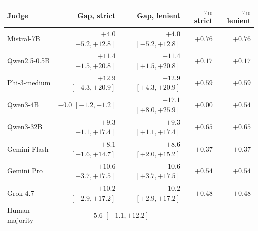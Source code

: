 \begin{tabular}{@{}lrrrr@{}}
\toprule
Judge & Gap, strict & Gap, lenient & $\tau_{10}$ strict & $\tau_{10}$ lenient \\
\midrule
Mistral-7B & $+4.0$ $[-5.2,+12.8]$ & $+4.0$ $[-5.2,+12.8]$ & $+0.76$ & $+0.76$ \\
Qwen2.5-0.5B & $+11.4$ $[+1.5,+20.8]$ & $+11.4$ $[+1.5,+20.8]$ & $+0.17$ & $+0.17$ \\
Phi-3-medium & $+12.9$ $[+4.3,+20.9]$ & $+12.9$ $[+4.3,+20.9]$ & $+0.59$ & $+0.59$ \\
Qwen3-4B & $-0.0$ $[-1.2,+1.2]$ & $+17.1$ $[+8.0,+25.9]$ & $+0.00$ & $+0.54$ \\
Qwen3-32B & $+9.3$ $[+1.1,+17.4]$ & $+9.3$ $[+1.1,+17.4]$ & $+0.65$ & $+0.65$ \\
Gemini Flash & $+8.1$ $[+1.6,+14.7]$ & $+8.6$ $[+2.0,+15.2]$ & $+0.37$ & $+0.37$ \\
Gemini Pro & $+10.6$ $[+3.7,+17.5]$ & $+10.6$ $[+3.7,+17.5]$ & $+0.54$ & $+0.54$ \\
Grok 4.7 & $+10.2$ $[+2.9,+17.2]$ & $+10.2$ $[+2.9,+17.2]$ & $+0.48$ & $+0.48$ \\
\midrule
Human majority & \multicolumn{2}{c}{$+5.6$ $[-1.1,+12.2]$} & --- & --- \\
\bottomrule
\end{tabular}
